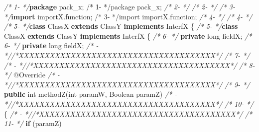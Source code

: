 \documentclass[
]{article}
\newenvironment{Shaded}{\begin{snugshade}}{\end{snugshade}}
\newcommand{\AttributeTok}[1]{\textcolor[rgb]{0.77,0.63,0.00}{#1}}
\newcommand{\BuiltInTok}[1]{#1}
\newcommand{\CommentTok}[1]{\textcolor[rgb]{0.56,0.35,0.01}{\textit{#1}}}
\newcommand{\DataTypeTok}[1]{\textcolor[rgb]{0.13,0.29,0.53}{#1}}
\newcommand{\FunctionTok}[1]{\textcolor[rgb]{0.00,0.00,0.00}{#1}}
\newcommand{\ImportTok}[1]{#1}
\newcommand{\KeywordTok}[1]{\textcolor[rgb]{0.13,0.29,0.53}{\textbf{#1}}}
\newcommand{\NormalTok}[1]{#1}
\begin{document}
\begin{landscape}
\begin{Shaded}
\begin{Highlighting}[]
\CommentTok{/*  1-                 */}\KeywordTok{package}\ImportTok{ pack_x;                                                /*  1-                 */package pack_x;}                                                
\CommentTok{/*  2-                 */}                                                               \CommentTok{/*  2-                 */}                                                               
\CommentTok{/*  3-                 */}\KeywordTok{import}\ImportTok{ importX.function;                                       /*  3-                 */import importX.function;}                                       
\CommentTok{/*  4-                 */}                                                               \CommentTok{/*  4-                 */}                                                               
\CommentTok{/*  5-                 */}\KeywordTok{class}\NormalTok{ ClassX }\KeywordTok{extends}\NormalTok{ ClassY }\KeywordTok{implements}\NormalTok{ InterfX \{               }\CommentTok{/*  5-                 */}\KeywordTok{class}\NormalTok{ ClassX }\KeywordTok{extends}\NormalTok{ ClassY }\KeywordTok{implements}\NormalTok{ InterfX \{               }
\CommentTok{/*  6-                 */}    \KeywordTok{private} \DataTypeTok{long}\NormalTok{ fieldX;                                       }\CommentTok{/*  6-                 */}    \KeywordTok{private} \DataTypeTok{long}\NormalTok{ fieldX;                                       }
\CommentTok{/*   -                 *//*XXXXXXXXXXXXXXXXXXXXXXXXXXXXXXXXXXXXXX*/}                     \CommentTok{/*  7-                 */}                                                               
\CommentTok{/*   -                 *//*XXXXXXXXXXXXXXXXXXXXXXXXXXXXXXXXXXXXXX*/}                     \CommentTok{/*  8-                 */}    \AttributeTok{@Override}                                                  
\CommentTok{/*   -                 *//*XXXXXXXXXXXXXXXXXXXXXXXXXXXXXXXXXXXXXX*/}                     \CommentTok{/*  9-                 */}    \KeywordTok{public} \DataTypeTok{int} \FunctionTok{methodZ}\NormalTok{(}\DataTypeTok{int}\NormalTok{ paramW, }\BuiltInTok{Boolean}\NormalTok{ paramZ)             }
\CommentTok{/*   -                 *//*XXXXXXXXXXXXXXXXXXXXXXXXXXXXXXXXXXXXXX*/}                     \CommentTok{/* 10-                 */}\NormalTok{    \{                                                          }
\CommentTok{/*   -                 *//*XXXXXXXXXXXXXXXXXXXXXXXXXXXXXXXXXXXXXX*/}                     \CommentTok{/* 11-                 */}        \KeywordTok{if}\NormalTok{ (paramZ)                                            }

\end{Highlighting}
\end{Shaded}
\end{landscape}
\end{document}
